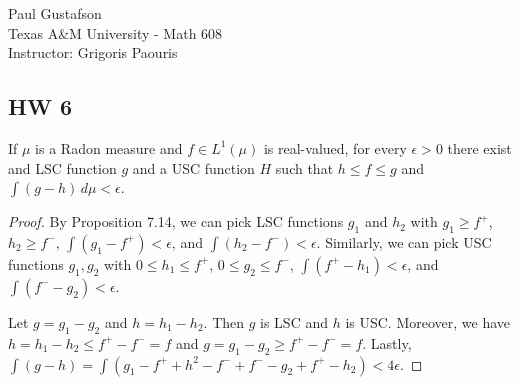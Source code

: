 \documentclass{article}
\begin{document}
\noindent Paul Gustafson\\
\noindent Texas A\&M University - Math 608 \\ 
\noindent Instructor: Grigoris Paouris

\subsection*{HW 6}

 If $\mu$ is a Radon measure and $f \in L^1(\mu)$ is real-valued, for every $\epsilon > 0$ there exist
and LSC function $g$ and a USC function $H$ such that $h \le f \le g$ and $\int (g - h) \, d \mu < \epsilon$.
\begin{proof}
By Proposition 7.14, we can pick LSC functions $g_1$ and $h_2$ with $g_1 \ge f^+$,  $h_2 \ge f^-$,
$\int (g_1 - f^+) < \epsilon$, and $\int (h_2 - f^-) < \epsilon$.   Similarly, we can pick USC functions
$g_1, g_2 $ with $0 \le h_1 \le f^+$, $ 0 \le g_2 \le f^-$, $\int (f^+ - h_1) < \epsilon$, and 
$\int (f^- - g_2) < \epsilon$.

Let $g = g_1 - g_2$ and $h = h_1 - h_2$.  Then $g$ is LSC and $h$ is USC.  Moreover, we have
$h = h_1 - h_2 \le f^+ - f^- = f$ and $g = g_1 - g_2 \ge f^+ - f^- = f$. Lastly,
$\int (g - h) = \int (g_1 - f^+ + h^2 - f^- + f^- -  g_2 + f^+ - h_2) < 4 \epsilon$.
\end{proof}
\end{document}
